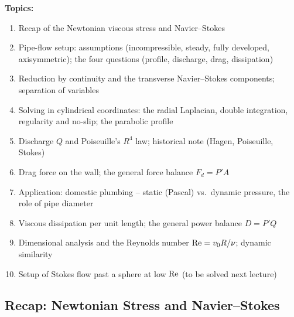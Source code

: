 \documentclass[../main.tex]{subfiles}
\begin{document}
\medskip\noindent\textbf{Topics:}
\begin{enumerate}
  \item Recap of the Newtonian viscous stress and Navier--Stokes
  \item Pipe-flow setup: assumptions (incompressible, steady, fully developed, axisymmetric); the four questions (profile, discharge, drag, dissipation)
  \item Reduction by continuity and the transverse Navier--Stokes components; separation of variables
  \item Solving in cylindrical coordinates: the radial Laplacian, double integration, regularity and no-slip; the parabolic profile
  \item Discharge $Q$ and Poiseuille's $R^4$ law; historical note (Hagen, Poiseuille, Stokes)
  \item Drag force on the wall; the general force balance $F_d=P'A$
  \item Application: domestic plumbing -- static (Pascal) vs.\ dynamic pressure, the role of pipe diameter
  \item Viscous dissipation per unit length; the general power balance $D=P'Q$
  \item Dimensional analysis and the Reynolds number $\mathrm{Re}=v_0R/\nu$; dynamic similarity
  \item Setup of Stokes flow past a sphere at low $\mathrm{Re}$ (to be solved next lecture)
\end{enumerate}

\subsection{Recap: Newtonian Stress and Navier--Stokes}\label{sec:lec20:recap}
\end{document}
